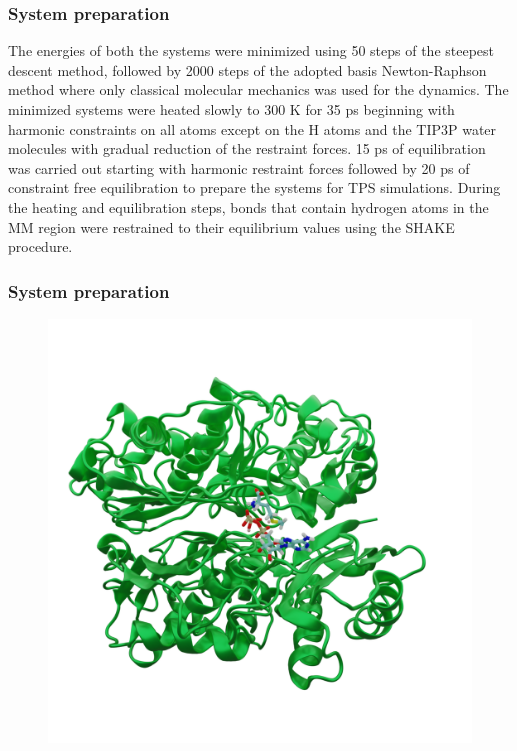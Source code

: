 \documentclass{beamer}
\begin{document}
\begin{frame}
\frametitle{System preparation}
The energies of both the systems were minimized using 50 steps of the 
steepest descent method, followed by 2000 steps of the
adopted basis Newton-Raphson method where only classical molecular mechanics 
was used for the dynamics. 
The minimized systems were
heated slowly to 300 K for 35 ps beginning with harmonic
constraints on all atoms except on the H atoms and the TIP3P 
water molecules with gradual reduction of the restraint forces. 
15 ps of equilibration was carried out starting with harmonic 
restraint forces followed by 20 ps of constraint free 
equilibration to prepare the systems for TPS simulations. 
During the heating and equilibration steps, bonds that contain 
hydrogen atoms in the MM region were restrained to their equilibrium values 
using the SHAKE procedure. %
\end{frame}
\begin{frame}
\frametitle{System preparation}
\begin{figure}
\centering 
\includegraphics[scale=0.2]{figures/mat2a-equil.png}
\end{figure}
\end{frame}
\end{document}
